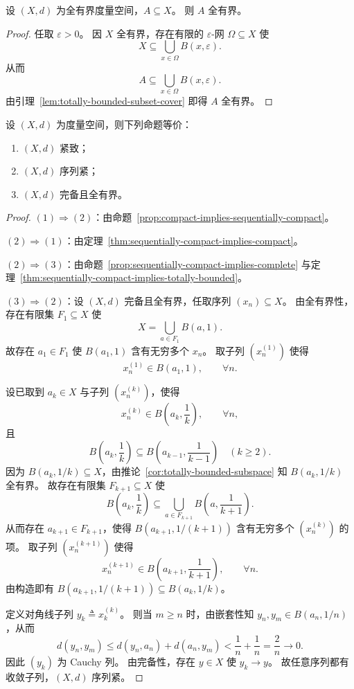 \documentclass[lang=cn,a4paper,newtx,section]{elegantbook}
\begin{document}
\begin{corollary}\label{cor:totally-bounded-subspace}
  设 $(X,d)$ 为全有界度量空间，$A\subseteq X$。
  则 $A$ 全有界。
\end{corollary}

\begin{proof}
  任取 $\varepsilon>0$。
  因 $X$ 全有界，存在有限的 $\varepsilon$-网 $\Omega\subseteq X$ 使
  \[
    X\subseteq\bigcup_{x\in\Omega}B(x,\varepsilon).
  \]
  从而
  \[
    A\subseteq\bigcup_{x\in\Omega}B(x,\varepsilon).
  \]
  由引理~\ref{lem:totally-bounded-subset-cover} 即得 $A$ 全有界。
\end{proof}

\begin{theorem}\label{thm:compact-sequential-compact-complete-totally-bounded}
  设 $(X,d)$ 为度量空间，则下列命题等价：
  \begin{enumerate}
    \item $(X,d)$ 紧致；
    \item $(X,d)$ 序列紧；
    \item $(X,d)$ 完备且全有界。
  \end{enumerate}
\end{theorem}

\begin{proof}
  $(1)\Rightarrow(2)$：由命题~\ref{prop:compact-implies-sequentially-compact}。

  $(2)\Rightarrow(1)$：由定理~\ref{thm:sequentially-compact-implies-compact}。

  $(2)\Rightarrow(3)$：由命题~\ref{prop:sequentially-compact-implies-complete} 与定理~\ref{thm:sequentially-compact-implies-totally-bounded}。

  $(3)\Rightarrow(2)$：设 $(X,d)$ 完备且全有界，任取序列 $(x_n)\subseteq X$。
  由全有界性，存在有限集 $F_1\subseteq X$ 使
  \[
    X=\bigcup_{a\in F_1}B(a,1).
  \]
  故存在 $a_1\in F_1$ 使 $B(a_1,1)$ 含有无穷多个 $x_n$。
  取子列 $(x_n^{(1)})$ 使得
  \[
    x_n^{(1)}\in B(a_1,1),\qquad \forall n.
  \]

  设已取到 $a_k\in X$ 与子列 $(x_n^{(k)})$，使得
  \[
    x_n^{(k)}\in B\left(a_k,\frac{1}{k}\right),\qquad \forall n,
  \]
  且
  \[
    B\left(a_k,\frac{1}{k}\right)\subseteq B\left(a_{k-1},\frac{1}{k-1}\right)\quad (k\ge2).
  \]
  因为 $B(a_k,1/k)\subseteq X$，由推论~\ref{cor:totally-bounded-subspace} 知 $B(a_k,1/k)$ 全有界。
  故存在有限集 $F_{k+1}\subseteq X$ 使
  \[
    B\left(a_k,\frac{1}{k}\right)\subseteq\bigcup_{a\in F_{k+1}}B\left(a,\frac{1}{k+1}\right).
  \]
  从而存在 $a_{k+1}\in F_{k+1}$，使得 $B(a_{k+1},1/(k+1))$ 含有无穷多个 $(x_n^{(k)})$ 的项。
  取子列 $(x_n^{(k+1)})$ 使得
  \[
    x_n^{(k+1)}\in B\left(a_{k+1},\frac{1}{k+1}\right),\qquad \forall n.
  \]
  由构造即有 $B(a_{k+1},1/(k+1))\subseteq B(a_k,1/k)$。

  定义对角线子列 $y_k\triangleq x_k^{(k)}$。
  则当 $m\ge n$ 时，由嵌套性知 $y_n,y_m\in B(a_n,1/n)$，从而
  \[
    d(y_n,y_m)\le d(y_n,a_n)+d(a_n,y_m)<\frac{1}{n}+\frac{1}{n}=\frac{2}{n}\to0.
  \]
  因此 $(y_k)$ 为 Cauchy 列。
  由完备性，存在 $y\in X$ 使 $y_k\to y$。
  故任意序列都有收敛子列，$(X,d)$ 序列紧。
\end{proof}
\end{document}
